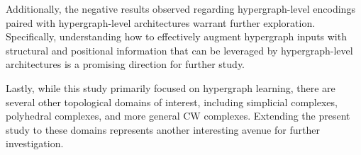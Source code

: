 Additionally, the negative results observed regarding hypergraph-level encodings paired with hypergraph-level architectures warrant further exploration. Specifically, understanding how to effectively augment hypergraph inputs with structural and positional information that can be leveraged by hypergraph-level architectures is a promising direction for further study.

Lastly, while this study primarily focused on hypergraph learning, there are several other topological domains of interest, including simplicial complexes, polyhedral complexes, and more general CW complexes. Extending the present study to these domains represents another interesting avenue for further investigation.